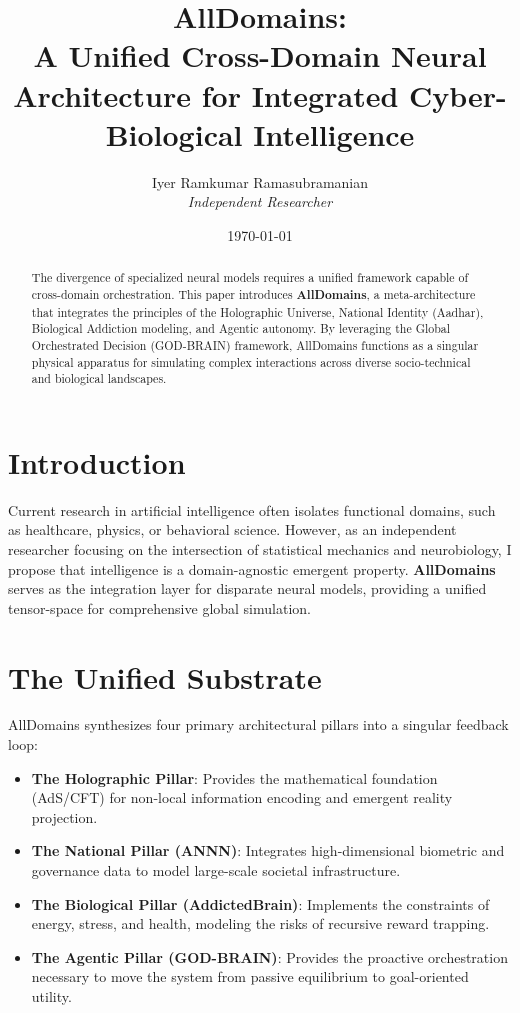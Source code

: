 \documentclass[12pt]{article}
\title{\textbf{AllDomains: \\ A Unified Cross-Domain Neural Architecture for Integrated Cyber-Biological Intelligence}}
\author{Iyer Ramkumar Ramasubramanian \\ \textit{Independent Researcher}}
\date{\today}
\begin{document}
\maketitle

\begin{abstract}
The divergence of specialized neural models requires a unified framework capable of cross-domain orchestration. This paper introduces \textbf{AllDomains}, a meta-architecture that integrates the principles of the Holographic Universe, National Identity (Aadhar), Biological Addiction modeling, and Agentic autonomy. By leveraging the Global Orchestrated Decision (GOD-BRAIN) framework, AllDomains functions as a singular physical apparatus for simulating complex interactions across diverse socio-technical and biological landscapes.
\end{abstract}

\section{Introduction}
Current research in artificial intelligence often isolates functional domains, such as healthcare, physics, or behavioral science. However, as an independent researcher focusing on the intersection of statistical mechanics and neurobiology, I propose that intelligence is a domain-agnostic emergent property. \textbf{AllDomains} serves as the integration layer for disparate neural models, providing a unified tensor-space for comprehensive global simulation.

\section{The Unified Substrate}

AllDomains synthesizes four primary architectural pillars into a singular feedback loop:

\begin{itemize}
\item \textbf{The Holographic Pillar}: Provides the mathematical foundation (AdS/CFT) for non-local information encoding and emergent reality projection.
\item \textbf{The National Pillar (ANNN)}: Integrates high-dimensional biometric and governance data to model large-scale societal infrastructure.
\item \textbf{The Biological Pillar (AddictedBrain)}: Implements the constraints of energy, stress, and health, modeling the risks of recursive reward trapping.
\item \textbf{The Agentic Pillar (GOD-BRAIN)}: Provides the proactive orchestration necessary to move the system from passive equilibrium to goal-oriented utility.
\end{itemize}
\end{document}
